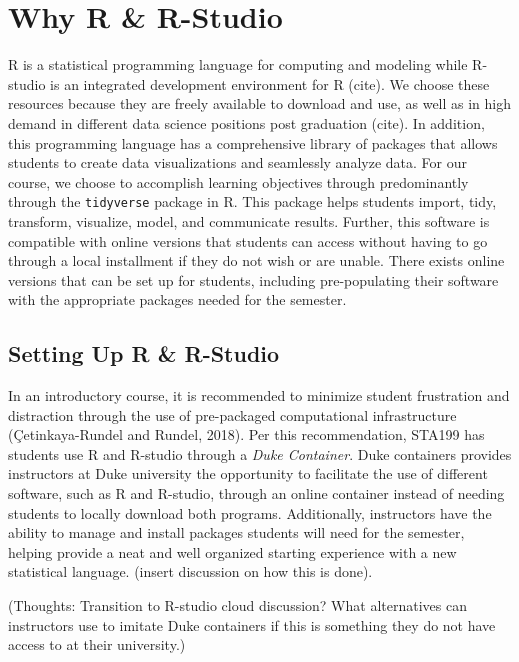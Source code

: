 \documentclass[
  12pt]{article}
\begin{document}
\hypertarget{why-r-r-studio}{%
\section{Why R \& R-Studio}\label{why-r-r-studio}}

R is a statistical programming language for computing and modeling while
R-studio is an integrated development environment for R (cite). We
choose these resources because they are freely available to download and
use, as well as in high demand in different data science positions post
graduation (cite). In addition, this programming language has a
comprehensive library of packages that allows students to create data
visualizations and seamlessly analyze data. For our course, we choose to
accomplish learning objectives through predominantly through the
\texttt{tidyverse} package in R. This package helps students import,
tidy, transform, visualize, model, and communicate results. Further,
this software is compatible with online versions that students can
access without having to go through a local installment if they do not
wish or are unable. There exists online versions that can be set up for
students, including pre-populating their software with the appropriate
packages needed for the semester.

\hypertarget{setting-up-r-r-studio}{%
\subsection{Setting Up R \& R-Studio}\label{setting-up-r-r-studio}}

In an introductory course, it is recommended to minimize student
frustration and distraction through the use of pre-packaged
computational infrastructure (Çetinkaya-Rundel and Rundel, 2018). Per
this recommendation, STA199 has students use R and R-studio through a
\emph{Duke Container}. Duke containers provides instructors at Duke
university the opportunity to facilitate the use of different software,
such as R and R-studio, through an online container instead of needing
students to locally download both programs. Additionally, instructors
have the ability to manage and install packages students will need for
the semester, helping provide a neat and well organized starting
experience with a new statistical language. (insert discussion on how
this is done).

(Thoughts: Transition to R-studio cloud discussion? What alternatives
can instructors use to imitate Duke containers if this is something they
do not have access to at their university.)
\end{document}
